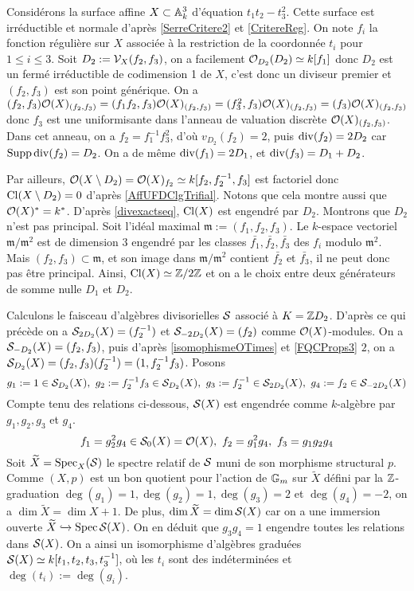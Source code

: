 \begin{ex}
Considérons la surface affine $X\subset \mathbb{A}_k^3$ d'équation $t_1t_2-t_3^2$. Cette surface est irréductible et normale d'après \ref{SerreCritere2} et \ref{CritereReg}. On note $f_i$ la fonction régulière sur $X$ associée à la restriction de la coordonnée $t_i$ pour $1\leq i\leq 3$. Soit $D_2:=\mathcal{V}_X(f_2,f_3)$, on a facilement $\mathcal{O}_{D_2}(D_2)\simeq k[f_1]$ donc $D_2$ est un fermé irréductible de codimension 1 de $X$, c'est donc un diviseur premier et $(f_2,f_3)$ est son point générique. On a $(f_2,f_3)\mathcal{O}(X)_{(f_2,f_3)}=(f_1f_2,f_3)\mathcal{O}(X)_{(f_2,f_3)}=(f_3^2,f_3)\mathcal{O}(X)_{(f_2,f_3)}=(f_3)\mathcal{O}(X)_{(f_2,f_3)}$ donc $f_3$ est une uniformisante dans l'anneau de valuation discrète $\mathcal{O}(X)_{(f_2,f_3)}$. Dans cet anneau, on a $f_2=f_1^{-1}f_3^2$, d'où $v_{D_2}(f_2)=2$, puis $\operatorname{div}(f_2)=2D_2$ car $\operatorname{Supp} \operatorname{div}(f_2)=D_2$. On a de même $\operatorname{div}(f_1)=2D_1$, et $\operatorname{div}(f_3)=D_1+D_2$.

Par ailleurs, $\mathcal{O}(X\setminus D_2)=\mathcal{O}(X)_{f_2}\simeq k[f_2,f_2^{-1},f_3]$ est factoriel donc $\operatorname{Cl}(X\setminus D_2)=0$ d'après \ref{AffUFDClgTrifial}. Notons que cela montre aussi que $\mathcal{O}(X)^*=k^*$. D'après \ref{divexactseq}, $\operatorname{Cl}(X)$ est engendré par $D_2$. Montrons que $D_2$ n'est pas principal. Soit l'idéal maximal $\mathfrak{m}:=(f_1,f_2,f_3)$. Le $k$-espace vectoriel $\mathfrak{m}/\mathfrak{m}^2$ est de dimension $3$ engendré par les classes $\bar{f_1},\bar{f_2},\bar{f_3}$ des $f_i$ modulo $\mathfrak{m}^2$. Mais $(f_2,f_3)\subset \mathfrak{m}$, et son image dans $\mathfrak{m}/\mathfrak{m}^2$ contient $\bar{f_2}$ et $\bar{f_3}$, il ne peut donc pas être principal. Ainsi, $\operatorname{Cl}(X)\simeq \mathbb{Z}/2\mathbb{Z}$ et on a le choix entre deux générateurs de somme nulle $D_1$ et $D_2$.

Calculons le faisceau d'algèbres divisorielles $\mathcal{S}$ associé à $K=\mathbb{Z} D_2$. D'après ce qui précède on a $\mathcal{S}_{2D_2}(X)=(f_2^{-1})$ et $\mathcal{S}_{-2D_2}(X)=(f_2)$ comme $\mathcal{O}(X)$-modules. On a $\mathcal{S}_{-D_2}(X)=(f_2,f_3)$, puis d'après \ref{isomophismeOTimes} et \ref{FQCProps3} $2$, on a $\mathcal{S}_{D_2}(X)=(f_2,f_3)(f_2^{-1})=(1,f_2^{-1}f_3)$. Posons 
$$g_1:=1\in\mathcal{S}_{D_2}(X), \,\,g_2:=f_2^{-1}f_3\in\mathcal{S}_{D_2}(X),\,\,g_3:=f_2^{-1}\in \mathcal{S}_{2D_2}(X), \,\,g_4:=f_2\in\mathcal{S}_{-2D_2}(X)$$
Compte tenu des relations ci-dessous, $\mathcal{S}(X)$ est engendrée comme $k$-algèbre par $g_1,g_2,g_3$ et $g_4$.
$$f_1=g_2^2g_4\in\mathcal{S}_0(X)=\mathcal{O}(X),\,\,f_2=g_1^2g_4,\,\,f_3=g_1g_2g_4$$
Soit $\widetilde{X}=\operatorname{Spec}_X(\mathcal{S})$ le spectre relatif de $\mathcal{S}$ muni de son morphisme structural $p$. Comme $(X,p)$ est un bon quotient pour l'action de $\mathbb{G}_m$ sur $\widetilde{X}$ défini par la $\mathbb{Z}$-graduation $\deg(g_1)=1,\deg(g_2)=1,\deg(g_3)=2$ et $\deg(g_4)=-2$, on a $\dim \widetilde{X}=\dim X+ 1$. De plus, $\dim \widetilde{X}=\dim \mathcal{S}(X)$ car on a une immersion ouverte $\widetilde{X}\xhookrightarrow{} \operatorname{Spec} \mathcal{S}(X)$. On en déduit que $g_3g_4=1$ engendre toutes les relations dans $\mathcal{S}(X)$. On a ainsi un isomorphisme d'algèbres graduées $\mathcal{S}(X)\simeq k[t_1,t_2,t_3, t_3^{-1}]$, où les $t_i$ sont des indéterminées et $\deg(t_i):=\deg(g_i)$.


\end{ex}
